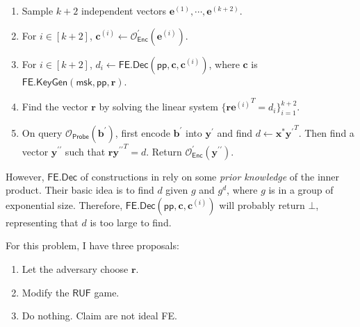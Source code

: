 \begin{enumerate}

\item Sample $k+2$ independent vectors $\mathbf{e}^{(1)}, \cdots, \mathbf{e}^{(k+2)}$.

\item For $i \in [k+2]$, $\mathbf{c}^{(i)} \gets \mathcal{O}^\prime_{\textsf{Enc}}(\mathbf{e}^{(i)})$.

\item For $i \in [k+2]$,  $d_i \gets \textsf{FE.Dec}(\textsf{pp}, \mathbf{c}, \mathbf{c}^{(i)})$, where $\mathbf{c}$ is $\textsf{FE.KeyGen}(\textsf{msk}, \textsf{pp}, \mathbf{r})$.

\item Find the vector $\mathbf{r}$ by solving the linear system $\{ \mathbf{r} {\mathbf{e}^{(i)}}^T = d_i \}_{i=1}^{k+2}$.

\item On query $\mathcal{O}_{\textsf{Probe}}(\mathbf{b}^\prime)$, first encode $\mathbf{b}^\prime$ into $\mathbf{y}^\prime$ and find $d \gets \mathbf{x}^{*}{\mathbf{y}^\prime}^T$. Then find a vector $\mathbf{y}^{\prime\prime}$ such that $\mathbf{r} {\mathbf{y}^{\prime\prime}}^T = d$. Return $\mathcal{O}^\prime_{\textsf{Enc}}(\mathbf{y}^{\prime\prime})$.

\end{enumerate}

However, $\textsf{FE.Dec}$ of constructions in \cite{cryptoeprint:2015/1255, 10.1007/978-3-319-45871-7_24, cryptoeprint:2016/440} rely on some \emph{prior knowledge} of the inner product. Their basic idea is to find $d$ given $g$ and $g^d$, where $g$ is in a group of exponential size. Therefore, $\textsf{FE.Dec}(\textsf{pp}, \mathbf{c}, \mathbf{c}^{(i)})$ will probably return $\bot$, representing that $d$ is too large to find.

For this problem, I have three proposals:
\begin{enumerate}
	\item Let the adversary choose $\mathbf{r}$.

	\item Modify the $\textsf{RUF}$ game. 

	\item Do nothing. Claim \cite{cryptoeprint:2015/1255, 10.1007/978-3-319-45871-7_24, cryptoeprint:2016/440} are not ideal \textsf{FE}.
\end{enumerate}


